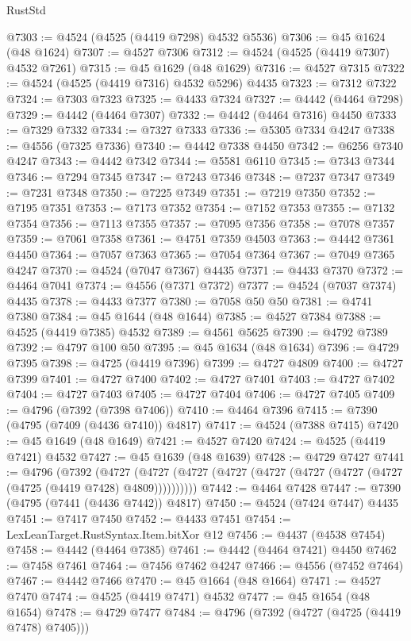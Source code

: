 \begin{lexlean}{RustStd}
\begin{coremodule}
@7303 := @4524 (@4525 (@4419 @7298) @4532 @5536)
@7306 := @45 @1624 (@48 @1624)
@7307 := @4527 @7306
@7312 := @4524 (@4525 (@4419 @7307) @4532 @7261)
@7315 := @45 @1629 (@48 @1629)
@7316 := @4527 @7315
@7322 := @4524 (@4525 (@4419 @7316) @4532 @5296) @4435
@7323 := @7312 @7322
@7324 := @7303 @7323
@7325 := @4433 @7324
@7327 := @4442 (@4464 @7298)
@7329 := @4442 (@4464 @7307)
@7332 := @4442 (@4464 @7316) @4450
@7333 := @7329 @7332
@7334 := @7327 @7333
@7336 := @5305 @7334 @4247
@7338 := @4556 (@7325 @7336)
@7340 := @4442 @7338 @4450
@7342 := @6256 @7340 @4247
@7343 := @4442 @7342
@7344 := @5581 @6110
@7345 := @7343 @7344
@7346 := @7294 @7345
@7347 := @7243 @7346
@7348 := @7237 @7347
@7349 := @7231 @7348
@7350 := @7225 @7349
@7351 := @7219 @7350
@7352 := @7195 @7351
@7353 := @7173 @7352
@7354 := @7152 @7353
@7355 := @7132 @7354
@7356 := @7113 @7355
@7357 := @7095 @7356
@7358 := @7078 @7357
@7359 := @7061 @7358
@7361 := @4751 @7359 @4503
@7363 := @4442 @7361 @4450
@7364 := @7057 @7363
@7365 := @7054 @7364
@7367 := @7049 @7365 @4247
@7370 := @4524 (@7047 @7367) @4435
@7371 := @4433 @7370
@7372 := @4464 @7041
@7374 := @4556 (@7371 @7372)
@7377 := @4524 (@7037 @7374) @4435
@7378 := @4433 @7377
@7380 := @7058 @50 @50
@7381 := @4741 @7380
@7384 := @45 @1644 (@48 @1644)
@7385 := @4527 @7384
@7388 := @4525 (@4419 @7385) @4532
@7389 := @4561 @5625
@7390 := @4792 @7389
@7392 := @4797 @100 @50
@7395 := @45 @1634 (@48 @1634)
@7396 := @4729 @7395
@7398 := @4725 (@4419 @7396)
@7399 := @4727 @4809
@7400 := @4727 @7399
@7401 := @4727 @7400
@7402 := @4727 @7401
@7403 := @4727 @7402
@7404 := @4727 @7403
@7405 := @4727 @7404
@7406 := @4727 @7405
@7409 := @4796 (@7392 (@7398 @7406))
@7410 := @4464 @7396
@7415 := @7390 (@4795 (@7409 (@4436 @7410)) @4817)
@7417 := @4524 (@7388 @7415)
@7420 := @45 @1649 (@48 @1649)
@7421 := @4527 @7420
@7424 := @4525 (@4419 @7421) @4532
@7427 := @45 @1639 (@48 @1639)
@7428 := @4729 @7427
@7441 := @4796
    (@7392
      (@4727 (@4727 (@4727 (@4727 (@4727 (@4727 (@4727 (@4727 (@4725 (@4419 @7428) @4809))))))))))
@7442 := @4464 @7428
@7447 := @7390 (@4795 (@7441 (@4436 @7442)) @4817)
@7450 := @4524 (@7424 @7447) @4435
@7451 := @7417 @7450
@7452 := @4433 @7451
@7454 := LexLeanTarget.RustSyntax.Item.bitXor @12
@7456 := @4437 (@4538 @7454)
@7458 := @4442 (@4464 @7385)
@7461 := @4442 (@4464 @7421) @4450
@7462 := @7458 @7461
@7464 := @7456 @7462 @4247
@7466 := @4556 (@7452 @7464)
@7467 := @4442 @7466
@7470 := @45 @1664 (@48 @1664)
@7471 := @4527 @7470
@7474 := @4525 (@4419 @7471) @4532
@7477 := @45 @1654 (@48 @1654)
@7478 := @4729 @7477
@7484 := @4796 (@7392 (@4727 (@4725 (@4419 @7478) @7405)))

\end{coremodule}
\end{lexlean}
